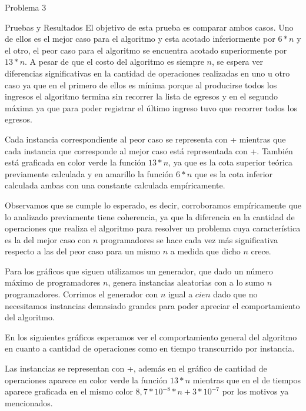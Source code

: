 \begin{section}{Problema 3}
\begin{subsection}{Pruebas y Resultados}
	El objetivo de esta prueba es comparar ambos casos. Uno de ellos es el mejor caso para el algoritmo y esta acotado inferiormente por $6*n$ y el otro, el peor caso para el algoritmo se encuentra acotado superiormente por $13*n$. A pesar de que el costo del algoritmo es siempre $n$, se espera ver diferencias significativas en la cantidad de operaciones realizadas en uno u otro caso ya que en el primero de ellos es mínima porque al producirse todos los ingresos el algoritmo termina sin recorrer la lista de egresos y en el segundo máxima ya que para poder registrar el último ingreso tuvo que recorrer todos los egresos.
	
	Cada instancia correspondiente al peor caso se representa con {\color{red}+} mientras que cada instancia que corresponde al mejor caso está representada con {\color{blue}+}. También está graficada en color verde la función $13*n$, ya que es la cota superior teórica previamente calculada y en amarillo la función $6*n$ que es la cota inferior calculada ambas con una constante calculada empíricamente.\VSP
	
	\VSP

	Observamos que se cumple lo esperado, es decir, corroboramos empíricamente que lo analizado previamente tiene coherencia, ya que la diferencia en la cantidad de operaciones que realiza el algoritmo para resolver un problema cuya característica es la del mejor caso con $n$ programadores se hace cada vez más significativa respecto a las del peor caso para un mismo $n$ a medida que dicho $n$ crece.
	
	Para los gráficos que siguen utilizamos un generador, que dado un número máximo de programadores $n$, genera instancias aleatorias con a lo sumo $n$ programadores. Corrimos el generador con $n$ igual a $cien$ dado que no necesitamos instancias demasiado grandes para poder apreciar el comportamiento del algoritmo.

	En los siguientes gráficos esperamos ver el comportamiento general del algoritmo en cuanto a cantidad de operaciones como en tiempo transcurrido por instancia.
	
	Las instancias se representan con {\color{red}+}, además en el gráfico de cantidad de operaciones aparece en color verde la función $13*n$ mientras que en el de tiempos aparece graficada en el mismo color $8,7*10^{-8}*n+3*10^{-7}$ por los motivos ya mencionados.\VSP

	\VSP
	


\end{subsection}
\end{section}
